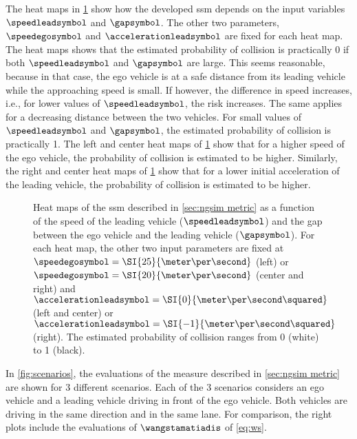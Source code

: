 The heat maps in \cref{fig:heatmaps} show how the developed \ac{ssm} depends on the input variables $\speedleadsymbol$ and $\gapsymbol$. 
The other two parameters, $\speedegosymbol$ and $\accelerationleadsymbol$ are fixed for each heat map.
The heat maps shows that the estimated probability of collision is practically 0 if both $\speedleadsymbol$ and $\gapsymbol$ are large.
This seems reasonable, because in that case, the ego vehicle is at a safe distance from its leading vehicle while the approaching speed is small. 
If however, the difference in speed increases, i.e., for lower values of $\speedleadsymbol$, the risk increases. 
The same applies for a decreasing distance between the two vehicles.
For small values of $\speedleadsymbol$ and $\gapsymbol$, the estimated probability of collision is practically 1.
The left and center heat maps of \cref{fig:heatmaps} show that for a higher speed of the ego vehicle, the probability of collision is estimated to be higher.
Similarly, the right and center heat maps of \cref{fig:heatmaps} show that for a lower initial acceleration of the leading vehicle, the probability of collision is estimated to be higher.

\setlength{\figurewidth}{.35\linewidth}
\setlength{\figureheight}{0.8\figurewidth}
\begin{figure}
	\centering
	
	\caption{Heat maps of the \ac{ssm} described in \cref{sec:ngsim metric} as a function of the speed of the leading vehicle ($\speedleadsymbol$) and the gap between the ego vehicle and the leading vehicle ($\gapsymbol$).
		For each heat map, the other two input parameters are fixed at $\speedegosymbol=\SI{25}{\meter\per\second}$ (left) or $\speedegosymbol=\SI{20}{\meter\per\second}$ (center and right) and $\accelerationleadsymbol=\SI{0}{\meter\per\second\squared}$ (left and center) or $\accelerationleadsymbol=\SI{-1}{\meter\per\second\squared}$ (right).
		The estimated probability of collision ranges from 0 (white) to 1 (black).}
	\label{fig:heatmaps}
\end{figure}

In \cref{fig:scenarios}, the evaluations of the measure described in \cref{sec:ngsim metric} are shown for 3 different scenarios. 
Each of the 3 scenarios considers an ego vehicle and a leading vehicle driving in front of the ego vehicle.
Both vehicles are driving in the same direction and in the same lane. 
For comparison, the right plots include the evaluations of $\wangstamatiadis$ of \cref{eq:ws}.

